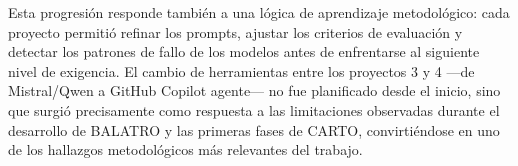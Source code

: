 Esta progresión responde también a una lógica de aprendizaje metodológico: cada proyecto permitió refinar los prompts, ajustar los criterios de evaluación y detectar los patrones de fallo de los modelos antes de enfrentarse al siguiente nivel de exigencia.
El cambio de herramientas entre los proyectos 3 y 4 ---de Mistral/Qwen a GitHub Copilot agente--- no fue planificado desde el inicio, sino que surgió precisamente como respuesta a las limitaciones observadas durante el desarrollo de \ac{BALATRO} y las primeras fases de \ac{CARTO}, convirtiéndose en uno de los hallazgos metodológicos más relevantes del trabajo.\\